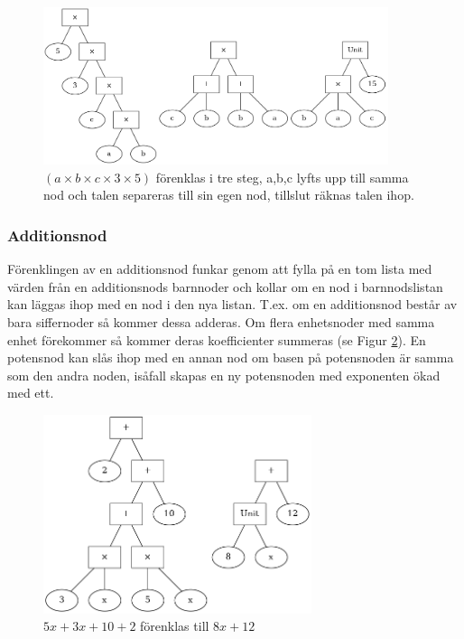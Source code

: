 \documentclass[12pt,a4paper]{article}
\begin{document}
\begin{figure}[h]
  \centering
  \includegraphics[width=0.9\textwidth]{image-merged}
  \caption{\((a \times b \times c \times 3 \times 5)\) förenklas i tre steg, a,b,c lyfts upp till samma nod och talen separeras till sin egen nod, tillslut räknas talen ihop.}
  \label{fig:2313}
\end{figure}
\subsubsection{Additionsnod}
Förenklingen av en additionsnod funkar genom att fylla på en tom lista med värden från en additionsnods barnnoder och kollar om en nod i barnnodslistan kan läggas ihop med en nod i den nya listan. T.ex. om en additionsnod består av bara siffernoder så kommer dessa adderas. Om flera enhetsnoder med samma enhet förekommer så kommer deras koefficienter summeras (se Figur \ref{fig:2321}). En potensnod kan slås ihop med en annan nod om basen på potensnoden är samma som den andra noden, isåfall skapas en ny potensnoden med exponenten ökad med ett.
\begin{figure}[h!]
  \centering
  \includegraphics[width=0.7\textwidth]{image-merged2}
  \caption{\(5x + 3x + 10 + 2\) förenklas till \(8x + 12\)}
  \label{fig:2321}
\end{figure}
\end{document}
